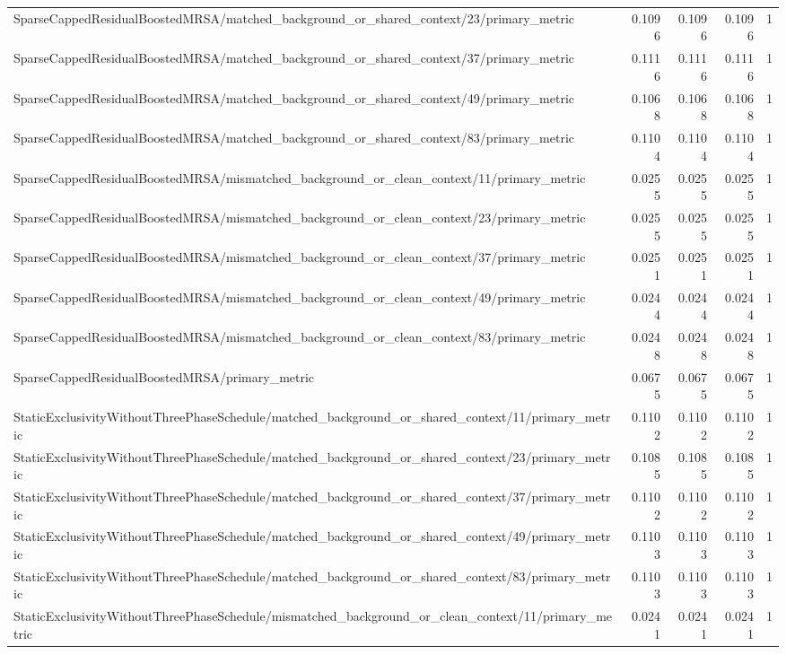 \begin{table}[h]
\begin{tabular}{lrrrr}
SparseCappedResidualBoostedMRSA/matched_background_or_shared_context/23/primary_metric & 0.1096 & 0.1096 & 0.1096 & 1 \\
SparseCappedResidualBoostedMRSA/matched_background_or_shared_context/37/primary_metric & 0.1116 & 0.1116 & 0.1116 & 1 \\
SparseCappedResidualBoostedMRSA/matched_background_or_shared_context/49/primary_metric & 0.1068 & 0.1068 & 0.1068 & 1 \\
SparseCappedResidualBoostedMRSA/matched_background_or_shared_context/83/primary_metric & 0.1104 & 0.1104 & 0.1104 & 1 \\
SparseCappedResidualBoostedMRSA/mismatched_background_or_clean_context/11/primary_metric & 0.0255 & 0.0255 & 0.0255 & 1 \\
SparseCappedResidualBoostedMRSA/mismatched_background_or_clean_context/23/primary_metric & 0.0255 & 0.0255 & 0.0255 & 1 \\
SparseCappedResidualBoostedMRSA/mismatched_background_or_clean_context/37/primary_metric & 0.0251 & 0.0251 & 0.0251 & 1 \\
SparseCappedResidualBoostedMRSA/mismatched_background_or_clean_context/49/primary_metric & 0.0244 & 0.0244 & 0.0244 & 1 \\
SparseCappedResidualBoostedMRSA/mismatched_background_or_clean_context/83/primary_metric & 0.0248 & 0.0248 & 0.0248 & 1 \\
SparseCappedResidualBoostedMRSA/primary_metric & 0.0675 & 0.0675 & 0.0675 & 1 \\
StaticExclusivityWithoutThreePhaseSchedule/matched_background_or_shared_context/11/primary_metric & 0.1102 & 0.1102 & 0.1102 & 1 \\
StaticExclusivityWithoutThreePhaseSchedule/matched_background_or_shared_context/23/primary_metric & 0.1085 & 0.1085 & 0.1085 & 1 \\
StaticExclusivityWithoutThreePhaseSchedule/matched_background_or_shared_context/37/primary_metric & 0.1102 & 0.1102 & 0.1102 & 1 \\
StaticExclusivityWithoutThreePhaseSchedule/matched_background_or_shared_context/49/primary_metric & 0.1103 & 0.1103 & 0.1103 & 1 \\
StaticExclusivityWithoutThreePhaseSchedule/matched_background_or_shared_context/83/primary_metric & 0.1103 & 0.1103 & 0.1103 & 1 \\
StaticExclusivityWithoutThreePhaseSchedule/mismatched_background_or_clean_context/11/primary_metric & 0.0241 & 0.0241 & 0.0241 & 1 \\

\end{tabular}
\end{table}
